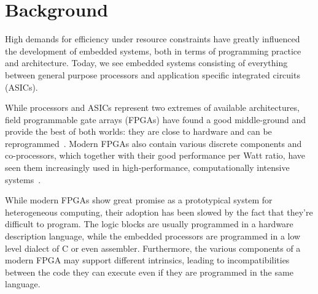 \documentclass[../main.tex]{subfiles}
\begin{document}
\chapter{Background}
\label{background}

High demands for efficiency under resource constraints have greatly influenced the development of embedded systems, both in terms of programming practice and architecture. Today, we see embedded systems consisting of everything between general purpose processors and application specific integrated circuits (ASICs).


While processors and ASICs represent two extremes of available architectures, field programmable gate arrays (FPGAs) have found a good middle-ground and provide the best of both worlds: they are close to hardware and can be reprogrammed~\cite{bacon2013}. Modern FPGAs also contain various discrete components and co-processors, which together with their good performance per Watt ratio, have seen them increasingly used in high-performance, computationally intensive systems~\cite{mcmillan2014}.


While modern FPGAs show great promise as a prototypical system for heterogeneous computing, their adoption has been slowed by the fact that they're difficult to program. The logic blocks are usually programmed in a hardware description language, while the embedded processors are programmed in a low level dialect of C or even assembler. Furthermore, the various components of a modern FPGA may support different intrinsics, leading to incompatibilities between the code they can execute even if they are programmed in the same language.


\end{document}
